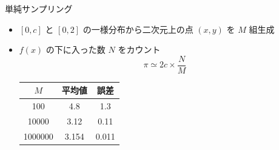 \documentclass[dvipdfmx]{beamer}
\begin{document}
\begin{frame}[t,fragile]{単純サンプリング}
  \begin{itemize}
    \setlength{\itemsep}{1em}
  \item $[0,c]$ と $[0,2]$ の一様分布から二次元上の点 $(x,y)$ を $M$ 組生成
  \item $f(x)$ の下に入った数 $N$ をカウント
    \[
    \pi \simeq 2c \times \frac{N}{M}
    \]
    \begin{tabular}{|c|c|c|}
      \hline
      $M$ & 平均値 & 誤差 \\
      \hline
      100 & 4.8 & 1.3 \\
      10000 & 3.12 & 0.11 \\
      1000000 & 3.154 & 0.011 \\
      \hline
    \end{tabular}
  \end{itemize}
  \vspace*{-7em}
  \hspace*{17em}
\end{frame}
\end{document}
